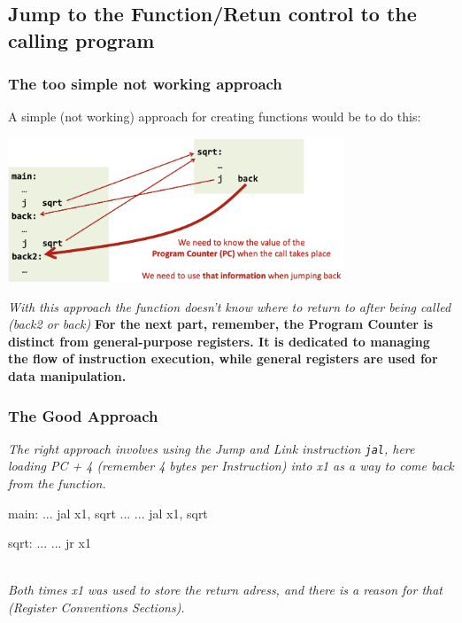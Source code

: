 \subsection{Jump to the Function/Retun control to the calling program}
\subsubsection{The too simple not working approach}
A simple (not working) approach for creating functions would be to do this: 
\begin{center}
    \includegraphics[width=0.75\textwidth]{chapters/chapter1b/images/function.png}
\end{center}
\textit{With this approach the function doesn't know where to return to after being called (back2 or back)}
\textbf{For the next part, remember, the Program Counter is distinct from general-purpose registers. It is dedicated to managing the flow of instruction execution, while general registers are used for data manipulation. }
\subsubsection{The Good Approach}
\textit{The right approach involves using the Jump and Link instruction \texttt{jal}, here loading PC + 4 (remember 4 bytes per Instruction) into x1 as a way to come back from the function.} \\
\begin{minipage}[htp]{0.4\textwidth}
\begin{assembly}
main:
    ...
    jal x1, sqrt
    ...
    ...
    jal x1, sqrt
\end{assembly}    
\end{minipage}
\hfill
\vline
\hfill
\begin{minipage}[htp]{0.4\textwidth}
\begin{assembly}
sqrt:
    ...
    ...
    jr x1
\end{assembly}
\end{minipage} \\
\textit{Both times x1 was used to store the return adress, and there is a reason for that (Register Conventions Sections).}

